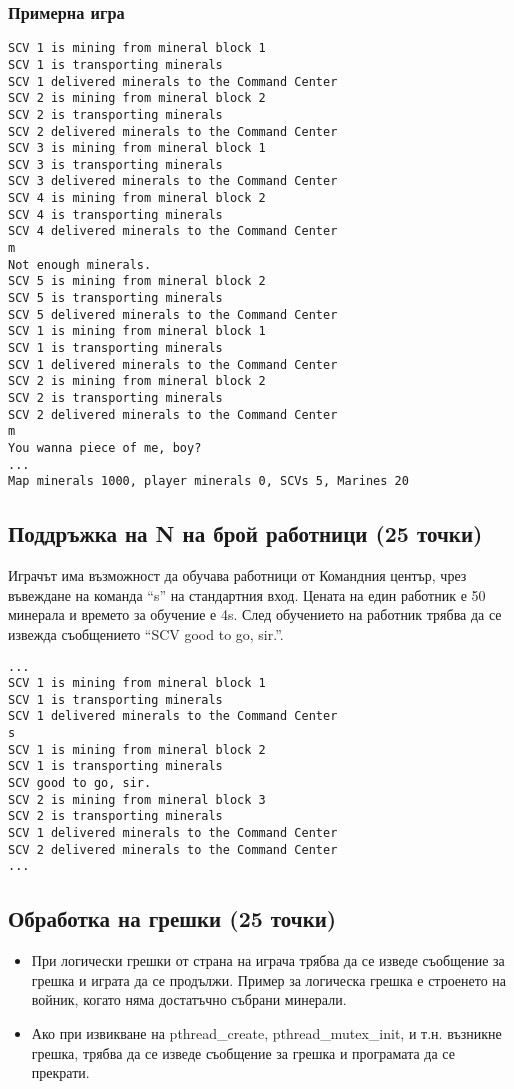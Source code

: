 \documentclass[a4paper,10pt]{article}
\begin{document}
			\subsubsection{Примерна игра}
				\begin{verbatim}
SCV 1 is mining from mineral block 1
SCV 1 is transporting minerals
SCV 1 delivered minerals to the Command Center
SCV 2 is mining from mineral block 2
SCV 2 is transporting minerals
SCV 2 delivered minerals to the Command Center
SCV 3 is mining from mineral block 1
SCV 3 is transporting minerals
SCV 3 delivered minerals to the Command Center
SCV 4 is mining from mineral block 2
SCV 4 is transporting minerals
SCV 4 delivered minerals to the Command Center
m
Not enough minerals.
SCV 5 is mining from mineral block 2
SCV 5 is transporting minerals
SCV 5 delivered minerals to the Command Center
SCV 1 is mining from mineral block 1
SCV 1 is transporting minerals
SCV 1 delivered minerals to the Command Center
SCV 2 is mining from mineral block 2
SCV 2 is transporting minerals
SCV 2 delivered minerals to the Command Center
m
You wanna piece of me, boy?
...
Map minerals 1000, player minerals 0, SCVs 5, Marines 20
\end{verbatim}
	
		\subsection{Поддръжка на N на брой работници (25 точки)}
		
			Играчът има възможност да обучава работници от Командния център, чрез въвеждане на команда ``s'' на стандартния вход. Цената на един работник е 50 минерала и времето за обучение е 4s. След обучението на работник трябва да се извежда съобщението ``SCV good to go, sir.''.
			
			\begin{verbatim}
...
SCV 1 is mining from mineral block 1
SCV 1 is transporting minerals 
SCV 1 delivered minerals to the Command Center
s
SCV 1 is mining from mineral block 2
SCV 1 is transporting minerals
SCV good to go, sir.
SCV 2 is mining from mineral block 3
SCV 2 is transporting minerals
SCV 1 delivered minerals to the Command Center
SCV 2 delivered minerals to the Command Center
...
\end{verbatim}
		\subsection{Обработка на грешки (25 точки)}
		\begin{itemize}
			\item При логически грешки от страна на играча трябва да се изведе съобщение за грешка и играта да се продължи. Пример за логическа грешка е строенето на войник, когато няма достатъчно събрани минерали.
			\item Ако при извикване на pthread\_create, pthread\_mutex\_init, и т.н. възникне грешка, трябва да се изведе съобщение за грешка и програмата да се прекрати.
		\end{itemize}
\end{document}
